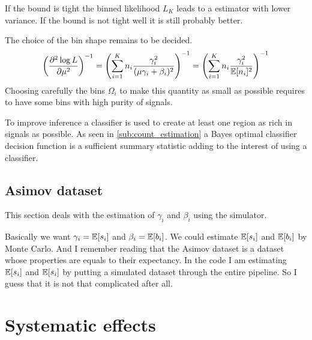 If the bound is tight the binned likelihood $L_K$ leads to a estimator with lower variance.
If the bound is not tight well it is still probably better.

The choice of the bin shape remains to be decided.
\begin{equation}
    \left (\frac{\partial^2 \log L}{\partial \mu^2}\right )^{-1} 
    	= \left ( \sum_{i=1}^K n_i \frac{\gamma_i^2}{(\mu \gamma_i + \beta_i)^2} \right )^{-1}
    	= \left ( \sum_{i=1}^K n_i \frac{\gamma_i^2}{\mathbb{E}[n_i]^2} \right )^{-1}
\end{equation}
Choosing carefully the bins $\Omega_i$ to make this quantity as small as possible requires to have some bins with high purity of signals.

To improve inference a classifier is used to create at least one region as rich in signals as possible.
As seen in \autoref{sub:count_estimation} a Bayes optimal classifier decision function is a sufficient summary statistic adding to the interest of using a classifier.








\subsection{Asimov dataset} %
\label{sub:asimov_dataset}

This section deals with the estimation of $\gamma_i$ and $\beta_i$ using the simulator.


Basically we want $\gamma_i = \mathbb{E} [s_i]$ and $\beta_i = \mathbb{E} [b_i]$.
We could estimate $\mathbb{E} [s_i]$ and $\mathbb{E} [b_i]$ by Monte Carlo.
And I remember reading that the Asimov dataset is a dataset whose properties are equals to their expectancy.
In the code I am estimating $\mathbb{E} [s_i]$ and $\mathbb{E} [s_i]$ by putting a simulated dataset through the entire pipeline.
So I guess that it is not that complicated after all.









\section{Systematic effects} %
\label{sec:systematic_effects}

